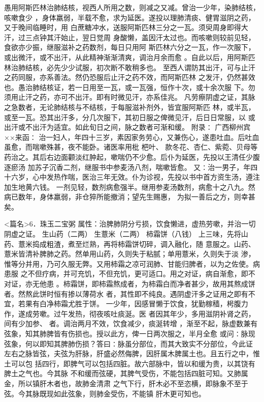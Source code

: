 \documentclass[a4paper,12pt,UTF8,twoside]{ctexbook}
\begin{document}
愚用阿斯匹林治肺结核，视西人所用之数，则减之又减。曾治一少年，染肺结核，咳嗽食少 
，身体羸弱，半载不愈，求为延医。遂投以理肺清痰、健胃滋阴之药，又于晚间临睡时，用 
白蔗糖冲水，送服阿斯匹林三分之一瓦。须臾周身即得大汗，过三点钟其汗始止，翌日觉周 
身酸懒，盖因汗太过也。而咳嗽则较前见轻，食欲亦少振，继服滋补之药数剂，每日只用阿 
斯匹林六分之一瓦，作一次服下，或出微汗，或不出汗，从此精神渐渐清爽，调治月余而愈 
。自此以后，用阿斯匹林治肺结核，必先少少试服，初次断不敢稍多也。 
至西人谓防其出汗，可与止汗之药同服，亦系善法。然仍恐服后止汗之药不效，而阿斯匹林 
之发汗，仍然甚效也。愚治肺结核证，若一日用至一瓦，或一瓦强，恒作十次，或十余次服 
下。勿须用止汗之药，亦可不出汗。即有时微见汗，亦系佳兆。 
凡劳瘵阴虚之证，其脉之急数者，无论肺结核与不结核，于每服滋补剂外，皆宜服阿斯匹 
林，或半瓦，或至一瓦。恐其出汗多，分几次服下，其初日服之俾微见汗，后日日常服，以 
或出汗或不出汗为适宜。如此旬日之间，脉之数者可渐和缓。 
附录∶ 
广西柳州宾××来函∶ 
治一妇人，年四十三岁，素因家务劳心，又兼伤心，遂患吐血。后吐血虽愈，而喘嗽殊甚，夜不能卧。诸医率用枇 
杷叶、 
款冬花、杏仁、紫菀、贝母等药治之。其后右边面颧淡红肿起，嗽喘仍不少愈。后仆为延医，先投以王清任少腹逐瘀汤 
加苏子沉香二剂，继服书中参麦汤八剂，喘嗽皆愈。 
又∶治一男子，年四十六岁，心中发热作喘，医治三年无效。仆为诊视，先投以书中首方资生汤，遵注加生地黄六钱。 
一剂见轻，数剂病愈强半。继用参麦汤数剂，病愈十之八九。然病已数年，身体羸弱，非仓猝所能撤消；望先生赐惠， 
为拟一善后之方，则幸甚矣。 

<篇名>6．珠玉二宝粥
属性：治脾肺阴分亏损，饮食懒进，虚热劳嗽，并治一切阴虚之证。 
生山药（二两） 生薏米（二两） 柿霜饼（八钱） 
上三味，先将山药、薏米捣成粗渣，煮至烂熟，再将柿霜饼切碎，调入融化，随 
意服之。山药、薏米皆清补脾肺之药。然单用山药，久则失于粘腻；单用薏米，久则失于淡 
渗，惟等分并用，乃可久服无弊。又用柿霜之凉可润肺、甘能归脾者，以为之佐使。病患服 
之不但疗病，并可充饥，不但充饥，更可适口。用之对证，病自渐愈，即不对证，亦无他患 
。柿霜饼，即柿霜熬成者，为柿霜白而净者甚少，故用其熬成饼者。然熬此饼时恒有掺以薄荷水 
者，其性即不纯良。遇阴虚汗多之证用之即有不宜，若果有白净柿霜尤胜于饼。 
一少年，因感冒懒于饮食，犹勤稼穑，枵腹力作，遂成劳嗽。过午发热，彻夜咳吐痰涎。医 
者因其年少，多用滋阴补肾之药，间有少加参、 者。调治两月不效，饮食减少，痰涎转增 
，渐至不起，脉虚数兼有弦象，知其肺脾皆有伤损也。授以此方，俾一日两次服之，半月全愈 
或问∶脉现弦象，何以即知其脾肺伤损？答曰∶脉虽分部位，而其大致实不分部位，今此证 
左右之脉皆弦，夫弦为肝脉，肝盛必然侮脾，因肝属木脾属土也。且五行之中，惟土可以包 
括四行，即脾气可以包括四脏。故六部脉中，皆以和缓为贵，以其饶有脾土之气也。今其脉 
不和缓而弦硬，其脾气受伤，不能包括四脏可知。又肺属金，所以镇肝木者也，故肺金清肃 
之气下行，肝木必不至恣横，即脉象不至于弦。今其脉既现如此弦象，则肺金受伤，不能镇 
肝木更可知也。 
\end{document}
